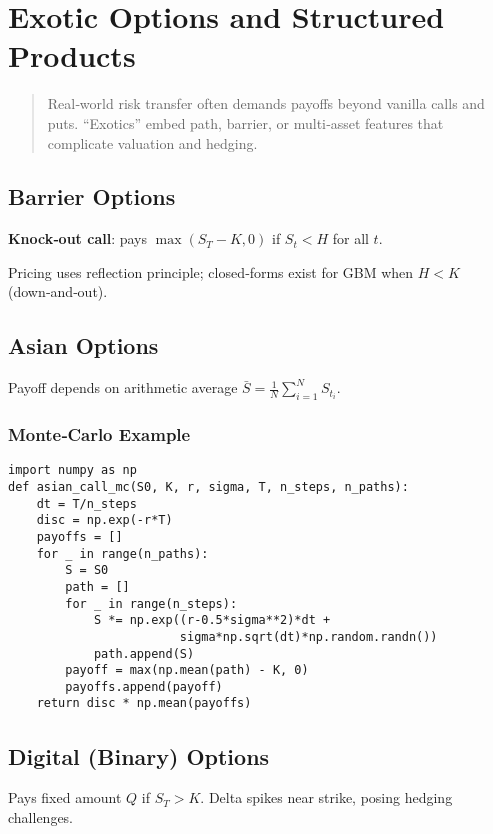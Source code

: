\chapter{Exotic Options and Structured Products}\label{ch:exotics}

\begin{abstract}
Real‑world risk transfer often demands payoffs beyond vanilla calls and
puts.  “Exotics” embed path, barrier, or multi‑asset features that
complicate valuation and hedging.
\end{abstract}

\section{Barrier Options}

\textbf{Knock‑out call}: pays \(\max(S_T-K,0)\) if \(S_t < H\) for all \(t\).

Pricing uses reflection principle; closed‑forms exist for GBM when
\(H<K\) (down‑and‑out).

\section{Asian Options}

Payoff depends on arithmetic average
\(\bar S = \tfrac{1}{N}\sum_{i=1}^{N}S_{t_i}\).

\subsection{Monte‑Carlo Example}

\begin{verbatim}
import numpy as np
def asian_call_mc(S0, K, r, sigma, T, n_steps, n_paths):
    dt = T/n_steps
    disc = np.exp(-r*T)
    payoffs = []
    for _ in range(n_paths):
        S = S0
        path = []
        for _ in range(n_steps):
            S *= np.exp((r-0.5*sigma**2)*dt +
                        sigma*np.sqrt(dt)*np.random.randn())
            path.append(S)
        payoff = max(np.mean(path) - K, 0)
        payoffs.append(payoff)
    return disc * np.mean(payoffs)
\end{verbatim}

\section{Digital (Binary) Options}

Pays fixed amount \(Q\) if \(S_T > K\).
Delta spikes near strike, posing hedging challenges.

